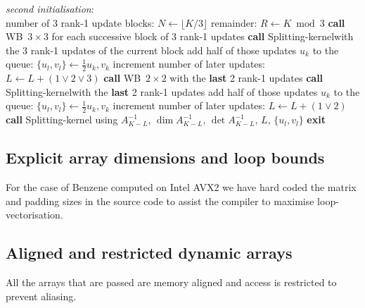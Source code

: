 \documentclass[11pt]{article}
\numberwithin{figure}{section}
\numberwithin{table}{section}
\begin{document}
\begin{algorithm}[H]
	\textit{second initialisation}:\\
	number of 3 rank-1 update blocks: $N \gets \lfloor K/3\rfloor$\;
	remainder: $R\gets K\bmod{3}$\;
	 {
		\textbf{call} WB~$3\times 3$ for each successive block of 3 rank-1 updates\;
		 {
			\textbf{call} Splitting-kernel\footnotemark[1] with the 3 rank-1 updates of the current block\;
			 {
				add half of those updates $u_k$ to the queue: $\{u_l,v_l\} \gets \frac{1}{2}u_k, v_k$\;
				increment number of later updates: $L \gets L + (1 \lor 2 \lor 3)$\;
			}
		}
	}
	 {
		\textbf{call} WB~$2\times 2$ with the \textbf{last} 2 rank-1 updates\;
		 {
			\textbf{call} Splitting-kernel\footnotemark[1] with the \textbf{last} 2 rank-1 updates\;
			 {
				add half of those updates $u_k$ to the queue: $\{u_l,v_l\} \gets \frac{1}{2}u_k, v_k$\;
				increment number of later updates: $L \gets L + (1 \lor 2)$\;
			}
		}
	}
	{
		\textbf{call} Splitting-kernel\footnotemark[2] using $A^{-1}_{K-L}$, $\dim A^{-1}_{K-L}$, $\det A^{-1}_{K-L} $, $L$, $\{u_l, v_l\}$\;
	}
	\textbf{exit}\;
\end{algorithm}

			 
			\subsection{Explicit array dimensions and loop bounds}
				For the case of Benzene computed on Intel AVX2 we have hard coded the matrix and padding sizes in the source code to assist the compiler to maximise loop-vectorisation. 
				 			
			\subsection{Aligned and restricted dynamic arrays}
				All the arrays that are passed are memory aligned and access is restricted to prevent aliasing.
\end{document}
